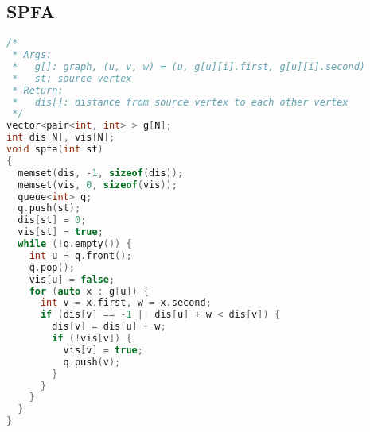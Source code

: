 \subsection{SPFA}
\begin{lstlisting}[language=c++]
/* 
 * Args:
 *   g[]: graph, (u, v, w) = (u, g[u][i].first, g[u][i].second) 
 *   st: source vertex
 * Return: 
 *   dis[]: distance from source vertex to each other vertex
 */
vector<pair<int, int> > g[N];
int dis[N], vis[N];
void spfa(int st)
{
  memset(dis, -1, sizeof(dis));
  memset(vis, 0, sizeof(vis));
  queue<int> q;
  q.push(st);
  dis[st] = 0;
  vis[st] = true;
  while (!q.empty()) {
    int u = q.front();
    q.pop();
    vis[u] = false;
    for (auto x : g[u]) {
      int v = x.first, w = x.second;
      if (dis[v] == -1 || dis[u] + w < dis[v]) {
        dis[v] = dis[u] + w;
        if (!vis[v]) {
          vis[v] = true;
          q.push(v);
        }
      }
    }
  }
}
\end{lstlisting}